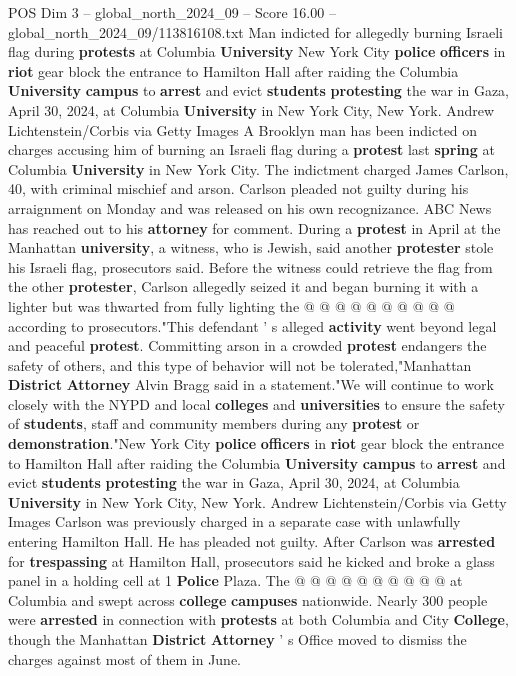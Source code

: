 \begin{textsample}{POS Dim 3 – global\_north\_2024\_09 – Score 16.00 – global\_north\_2024\_09/113816108.txt}  \label{ex:f3_pos_164}
Man indicted for allegedly burning Israeli flag during \textbf{protests} at Columbia \textbf{University} New York City \textbf{police} \textbf{officers} in \textbf{riot} gear block the entrance to Hamilton Hall after raiding the Columbia \textbf{University} \textbf{campus} to \textbf{arrest} and evict \textbf{students} \textbf{protesting} the war in Gaza, April 30, 2024, at Columbia \textbf{University} in New York City, New York.
Andrew Lichtenstein/Corbis via Getty Images A Brooklyn man has been indicted on charges accusing him of burning an Israeli flag during a \textbf{protest} last \textbf{spring} at Columbia \textbf{University} in New York City.
The indictment charged James Carlson, 40, with criminal mischief and arson.
Carlson pleaded not guilty during his arraignment on Monday and was released on his own recognizance.
ABC News has reached out to his \textbf{attorney} for comment.
During a \textbf{protest} in April at the Manhattan \textbf{university}, a witness, who is Jewish, said another \textbf{protester} stole his Israeli flag, prosecutors said.
Before the witness could retrieve the flag from the other \textbf{protester}, Carlson allegedly seized it and began burning it with a lighter but was thwarted from fully lighting the @ @ @ @ @ @ @ @ @ @ according to prosecutors."This defendant ' s alleged \textbf{activity} went beyond legal and peaceful \textbf{protest}.
Committing arson in a crowded \textbf{protest} endangers the safety of others, and this type of behavior will not be tolerated,"Manhattan \textbf{District} \textbf{Attorney} Alvin Bragg said in a statement."We will continue to work closely with the NYPD and local \textbf{colleges} and \textbf{universities} to ensure the safety of \textbf{students}, staff and community members during any \textbf{protest} or \textbf{demonstration}."New York City \textbf{police} \textbf{officers} in \textbf{riot} gear block the entrance to Hamilton Hall after raiding the Columbia \textbf{University} \textbf{campus} to \textbf{arrest} and evict \textbf{students} \textbf{protesting} the war in Gaza, April 30, 2024, at Columbia \textbf{University} in New York City, New York.
Andrew Lichtenstein/Corbis via Getty Images Carlson was previously charged in a separate case with unlawfully entering Hamilton Hall.
He has pleaded not guilty.
After Carlson was \textbf{arrested} for \textbf{trespassing} at Hamilton Hall, prosecutors said he kicked and broke a glass panel in a holding cell at 1 \textbf{Police} Plaza.
The @ @ @ @ @ @ @ @ @ @ at Columbia and swept across \textbf{college} \textbf{campuses} nationwide.
Nearly 300 people were \textbf{arrested} in connection with \textbf{protests} at both Columbia and City \textbf{College}, though the Manhattan \textbf{District} \textbf{Attorney} ' s Office moved to dismiss the charges against most of them in June.

\end{textsample}

